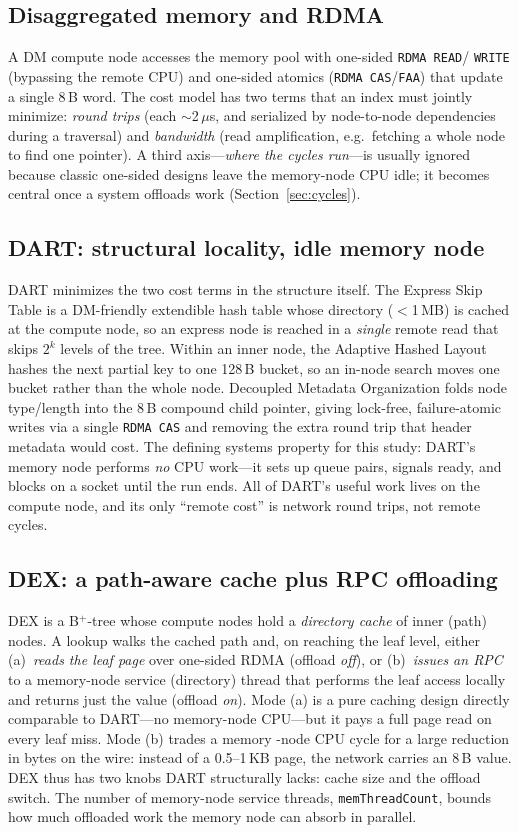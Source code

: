 \documentclass[sigconf,nonacm]{acmart}
\begin{document}
\subsection{Disaggregated memory and RDMA}
A DM compute node accesses the memory pool with one-sided \texttt{RDMA READ}/
\texttt{WRITE} (bypassing the remote CPU) and one-sided atomics
(\texttt{RDMA CAS}/\texttt{FAA}) that update a single 8\,B word. The cost model
has two terms that an index must jointly minimize: \emph{round trips} (each
$\sim$2\,$\mu$s, and serialized by node-to-node dependencies during a traversal)
and \emph{bandwidth} (read amplification, e.g.\ fetching a whole node to find one
pointer). A third axis---\emph{where the cycles run}---is usually ignored because
classic one-sided designs leave the memory-node CPU idle; it becomes central once
a system offloads work (Section~\ref{sec:cycles}).

\subsection{DART: structural locality, idle memory node}
DART minimizes the two cost terms in the structure itself. The Express Skip
Table is a DM-friendly extendible hash table whose directory ($<$1\,MB) is cached
at the compute node, so an express node is reached in a \emph{single} remote read
that skips $2^k$ levels of the tree. Within an inner node, the Adaptive Hashed
Layout hashes the next partial key to one 128\,B bucket, so an in-node search
moves one bucket rather than the whole node. Decoupled Metadata Organization
folds node type/length into the 8\,B compound child pointer, giving lock-free,
failure-atomic writes via a single \texttt{RDMA CAS} and removing the extra round
trip that header metadata would cost. The defining systems property for this
study: DART's memory node performs \emph{no} CPU work---it sets up queue pairs,
signals ready, and blocks on a socket until the run ends. All of DART's useful
work lives on the compute node, and its only ``remote cost'' is network round
trips, not remote cycles.

\subsection{DEX: a path-aware cache plus RPC offloading}
DEX is a B$^+$-tree whose compute nodes hold a \emph{directory cache} of inner
(path) nodes. A lookup walks the cached path and, on reaching the leaf level,
either (a)~\emph{reads the leaf page} over one-sided RDMA (offload \emph{off}),
or (b)~\emph{issues an RPC} to a memory-node service (directory) thread that
performs the leaf access locally and returns just the value (offload \emph{on}).
Mode (a) is a pure caching design directly comparable to DART---no memory-node
CPU---but it pays a full page read on every leaf miss. Mode (b) trades a memory
-node CPU cycle for a large reduction in bytes on the wire: instead of a
0.5--1\,KB page, the network carries an 8\,B value. DEX thus has two knobs DART
structurally lacks: cache size and the offload switch. The number of memory-node
service threads, \texttt{memThreadCount}, bounds how much offloaded work the
memory node can absorb in parallel.
\end{document}
